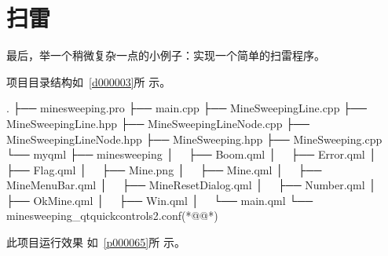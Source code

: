 ﻿




\FloatBarrier
\section{
扫雷
}\label{s100810t05}


最后，举一个稍微复杂一点的小例子：实现一个简单的扫雷程序。

项目目录结构如\treeindexnumbernameone\ \ref{d000003}所
示。

{}\label{d000003}    %
\begin{thebookfilesourceonepathtree}[escapeinside={(*@}{@*)},
caption=GoodLuck,
numbers=none,
title=\treeindexnumbernameone \thetreeindexnumber
]
.
├── minesweeping.pro
├── main.cpp
├── MineSweepingLine.cpp
├── MineSweepingLine.hpp
├── MineSweepingLineNode.cpp
├── MineSweepingLineNode.hpp
├── MineSweeping.hpp
├── MineSweeping.cpp
└── myqml
    ├── minesweeping
    │   ├── Boom.qml
    │   ├── Error.qml
    │   ├── Flag.qml
    │   ├── Mine.png
    │   ├── Mine.qml
    │   ├── MineMenuBar.qml
    │   ├── MineResetDialog.qml
    │   ├── Number.qml
    │   ├── OkMine.qml
    │   ├── Win.qml
    │   └── main.qml
    └── minesweeping_qtquickcontrols2.conf(*@\marginpar[\hfill\setlength\fboxsep{2pt}\fbox{\footnotesize{\kaishu\parbox{1em}{\setlength{\baselineskip}{2pt}\treeindexnumbernameone}}\footnotesize{\thetreeindexnumber}}]{\setlength\fboxsep{2pt}\fbox{\footnotesize{\kaishu\parbox{1em}{\setlength{\baselineskip}{2pt}\treeindexnumbernameone}}\footnotesize{\thetreeindexnumber}}}@*)\end{thebookfilesourceonepathtree}          %
\addtocounter{lstlisting}{-1}   %


此项目运行效果
如\figurename\ \ref{p000065}所
示。

